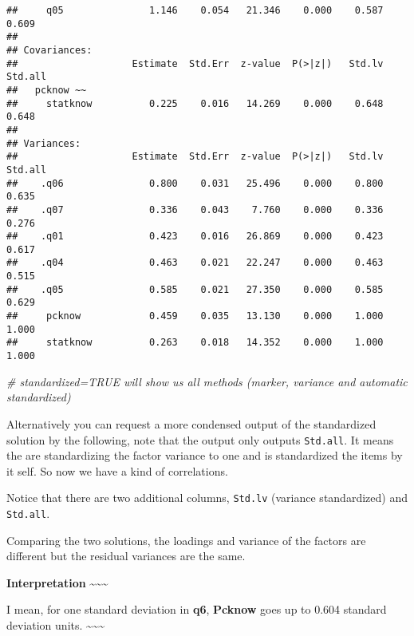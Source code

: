 \documentclass[
]{article}
\newenvironment{Shaded}{\begin{snugshade}}{\end{snugshade}}
\newcommand{\CommentTok}[1]{\textcolor[rgb]{0.56,0.35,0.01}{\textit{#1}}}
\begin{document}
\begin{verbatim}
##     q05               1.146    0.054   21.346    0.000    0.587    0.609
## 
## Covariances:
##                    Estimate  Std.Err  z-value  P(>|z|)   Std.lv  Std.all
##   pcknow ~~                                                             
##     statknow          0.225    0.016   14.269    0.000    0.648    0.648
## 
## Variances:
##                    Estimate  Std.Err  z-value  P(>|z|)   Std.lv  Std.all
##    .q06               0.800    0.031   25.496    0.000    0.800    0.635
##    .q07               0.336    0.043    7.760    0.000    0.336    0.276
##    .q01               0.423    0.016   26.869    0.000    0.423    0.617
##    .q04               0.463    0.021   22.247    0.000    0.463    0.515
##    .q05               0.585    0.021   27.350    0.000    0.585    0.629
##     pcknow            0.459    0.035   13.130    0.000    1.000    1.000
##     statknow          0.263    0.018   14.352    0.000    1.000    1.000
\end{verbatim}

\begin{Shaded}
\begin{Highlighting}[]
\CommentTok{\# standardized=TRUE will show us all methods (marker, variance and automatic standardized)}
\end{Highlighting}
\end{Shaded}

Alternatively you can request a more condensed output of the
standardized solution by the following, note that the output only
outputs \texttt{Std.all}. It means the are standardizing the factor
variance to one and is standardized the items by it self. So now we have
a kind of correlations.

Notice that there are two additional columns, \texttt{Std.lv} (variance
standardized) and \texttt{Std.all}.

Comparing the two solutions, the loadings and variance of the factors
are different but the residual variances are the same.

\textbf{Interpretation} \textasciitilde\textasciitilde\textasciitilde{}

I mean, for one standard deviation in \textbf{q6}, \textbf{Pcknow} goes
up to 0.604 standard deviation units.
\textasciitilde\textasciitilde\textasciitilde{}
\end{document}
